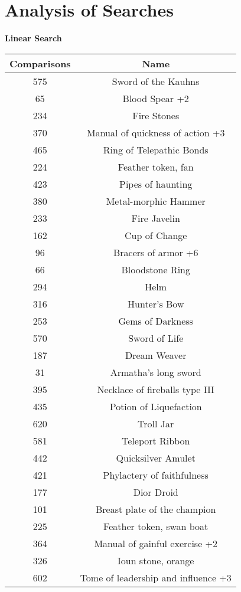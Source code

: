 \documentclass[letterpaper, 10pt]{article}
\begin{document}
\section{Analysis of Searches}
\newpage
\begin{center}
    \bf{Linear Search}\\
    \begin{tabular}{|| c c ||}
    \hline
    \bf{Comparisons} & \bf{Name} \\
    \hline
    575 & Sword of the Kauhns \\
    65  & Blood Spear +2\\
    234 & Fire Stones\\
    370 & Manual of quickness of action +3\\
    465 & Ring of Telepathic Bonds\\
    224 & Feather token, fan\\
    423 & Pipes of haunting\\
    380 & Metal-morphic Hammer\\
    233 & Fire Javelin\\
    162 & Cup of Change\\
    96  & Bracers of armor +6\\
    66  & Bloodstone Ring\\
    294 & Helm\\
    316 & Hunter's Bow\\
    253 & Gems of Darkness\\
    570 & Sword of Life\\
    187 & Dream Weaver\\
    31  & Armatha's long sword\\
    395 & Necklace of fireballs type III\\
    435 & Potion of Liquefaction\\
    620 & Troll Jar\\
    581 & Teleport Ribbon\\
    442 & Quicksilver Amulet\\
    421 & Phylactery of faithfulness\\
    177 & Dior Droid\\
    101 & Breast plate of the champion\\
    225 & Feather token, swan boat\\
    364 & Manual of gainful exercise +2\\
    326 & Ioun stone, orange\\
    602 & Tome of leadership and influence +3\\

\end{tabular}
\end{center}
\end{document}
